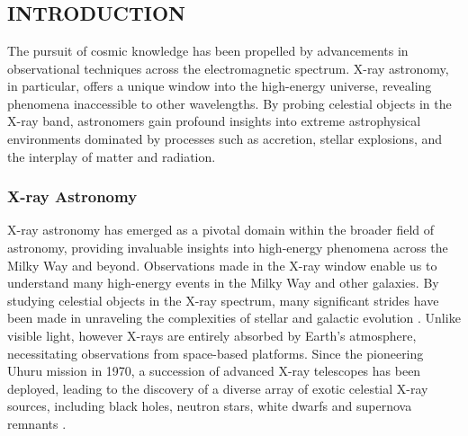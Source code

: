 \chapter{\MakeUppercase{\ChapterTitleOne}} \label{chap:introduction}
    \minitoc
    
    
    \newpage
    \section{\MakeUppercase{Introduction}} \label{introduction:introduction}
    	The pursuit of cosmic knowledge has been propelled by advancements in observational techniques across the electromagnetic spectrum.
 X-ray astronomy, in particular, offers a unique window into the high-energy universe, revealing phenomena inaccessible to other wavelengths. By probing celestial objects in the X-ray band, astronomers gain profound insights into extreme astrophysical environments dominated by processes such as accretion, stellar explosions, and the interplay of matter and radiation.
        
        \subsection{X-ray Astronomy} \label{introduction:introduction:x-ray-astro}
        	X-ray astronomy has emerged as a pivotal domain within the broader field of astronomy, providing invaluable insights into high-energy phenomena across the Milky Way and beyond. Observations made in the X-ray window enable us to understand many high-energy events in the Milky Way and other galaxies. By studying celestial objects in the X-ray spectrum, many significant strides have been made in unraveling the complexities of stellar and galactic evolution \cite{giacconi1962evidence}. Unlike visible light, however X-rays are entirely absorbed by Earth's atmosphere, necessitating observations from space-based platforms. Since the pioneering Uhuru mission in 1970, a succession of advanced X-ray telescopes has been deployed, leading to the discovery of a diverse array of exotic celestial X-ray sources, including black holes, neutron stars, white dwarfs and supernova remnants \cite{tanaka1996x}.
        	

